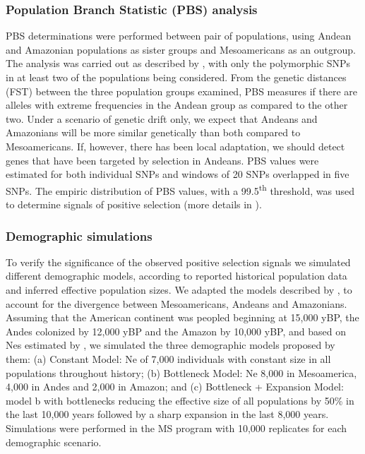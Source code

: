 \subsubsection{Population Branch Statistic (PBS) analysis}

PBS determinations were performed between pair of populations, using Andean and Amazonian populations as sister groups and Mesoamericans as an outgroup. The analysis was carried out as described by , with only the polymorphic SNPs in at least two of the populations being considered. From the genetic distances (FST) between the three population groups examined, PBS measures if there are alleles with extreme frequencies in the Andean group as compared to the other two. Under a scenario of genetic drift only, we expect that Andeans and Amazonians will be more similar genetically than both compared to Mesoamericans. If, however, there has been local adaptation, we should detect genes that have been targeted by selection in Andeans. PBS values were estimated for both individual SNPs and windows of 20 SNPs overlapped in five SNPs. The empiric distribution of PBS values, with a 99.5\textsuperscript{th} threshold, was used to determine signals of positive selection (more details in ).

\subsubsection{Demographic simulations}

To verify the significance of the observed positive selection signals we simulated different demographic models, according to reported historical population data and inferred effective population sizes. We adapted the models described by , to account for the divergence between Mesoamericans, Andeans and Amazonians. Assuming that the American continent was peopled beginning at 15,000 yBP, the Andes colonized by 12,000 yBP and the Amazon by 10,000 yBP, and based on Nes estimated by , we simulated the three demographic models proposed by them: (a) Constant Model: Ne of 7,000 individuals with constant size in all populations throughout history; (b) Bottleneck Model: Ne 8,000 in Mesoamerica, 4,000 in Andes and 2,000 in Amazon; and (c) Bottleneck + Expansion Model: model b with bottlenecks reducing the effective size of all populations by 50\% in the last 10,000 years followed by a sharp expansion in the last 8,000 years. Simulations were performed in the MS program \cite{hudson_generating_2002} with 10,000 replicates for each demographic scenario.

